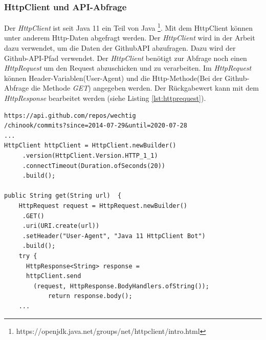 \subsubsection{HttpClient und API-Abfrage}
Der \textit{HttpClient} ist seit Java 11 ein Teil von Java \footnote{https://openjdk.java.net/groups/net/httpclient/intro.html}. Mit dem HttpClient können unter anderem Http-Daten abgefragt werden. Der \textit{HttpClient} wird in der Arbeit dazu verwendet, um die Daten der GithubAPI abzufragen. Dazu wird der Github-API-Pfad verwendet. Der \textit{HttpClient} benötigt zur Abfrage noch einen \textit{HttpRequest} um den Request abzuschicken und zu verarbeiten. Im \textit{HttpRequest} können Header-Variablen(User-Agent) und die Http-Methode(Bei der Github-Abfrage die Methode \textit{GET}) angegeben werden. Der Rückgabewert kann mit dem \textit{HttpResponse} bearbeitet werden (siehe Listing   \ref{lst:httprequest}).
\lstset{
  caption=[Listing für die Implementierung für die Abfrage der Github-API und Beispiel-Request.]{Listing für die Implementierung für die Abfrage der Github-API. Am Beginn des Listings wird in einem Kommentar ein Beispiel-Link für den Request angezeigt. Im Link enthalten ist der Benutzername des Users und der Datumsbereich, aus dem die Commits geladen werden sollen.}, 
  basicstyle=\small\ttfamily, 
  label=lst:httprequest, 
  language=Java,
  frame=single,
  breaklines=true, %
  postbreak=\mbox{\textcolor{red}{$\hookrightarrow$}\space},
}
\begin{samepage}%
	\begin{lstlisting}[float=tbhp]
https://api.github.com/repos/wechtig
/chinook/commits?since=2014-07-29&until=2020-07-28
...
HttpClient httpClient = HttpClient.newBuilder()
     .version(HttpClient.Version.HTTP_1_1)
     .connectTimeout(Duration.ofSeconds(20))
     .build();

public String get(String url)  {
    HttpRequest request = HttpRequest.newBuilder()
     .GET()
     .uri(URI.create(url))
     .setHeader("User-Agent", "Java 11 HttpClient Bot")
     .build();
    try {
      HttpResponse<String> response = 
      httpClient.send
      	(request, HttpResponse.BodyHandlers.ofString());
            return response.body();
	...
	\end{lstlisting}
\end{samepage}
